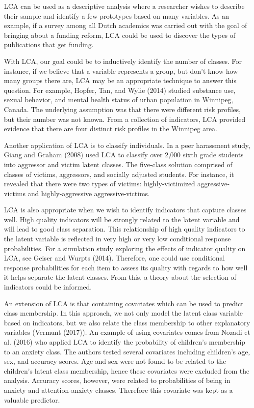 \documentclass[
  ,man,floatsintext]{apa6}
\begin{document}
LCA can be used as a descriptive analysis where a researcher wishes to
describe their sample and identify a few prototypes based on many
variables. As an example, if a survey among all Dutch academics was
carried out with the goal of bringing about a funding reform, LCA could
be used to discover the types of publications that get funding.

With LCA, our goal could be to inductively identify the number of
classes. For instance, if we believe that a variable represents a group,
but don't know how many groups there are, LCA may be an appropriate
technique to answer this question. For example, Hopfer, Tan, and Wylie (2014)
studied substance use, sexual behavior, and mental health status of
urban population in Winnipeg, Canada. The underlying assumption was that
there were different risk profiles, but their number was not known. From
a collection of indicators, LCA provided evidence that there are four
distinct risk profiles in the Winnipeg area.

Another application of LCA is to classify individuals. In a peer
harassment study, Giang and Graham (2008) used LCA to classify over 2,000
sixth grade students into aggressor and victim latent classes. The
five-class solution comprised of classes of victims, aggressors, and
socially adjusted students. For instance, it revealed that there were
two types of victims: highly-victimized aggressive-victims and
highly-aggressive aggressive-victims.

LCA is also appropriate when we wish to identify indicators that capture
classes well. High quality indicators will be strongly related to the
latent variable and will lead to good class separation. This
relationship of high quality indicators to the latent variable is
reflected in very high or very low conditional response probabilities.
For a simulation study exploring the effects of indicator quality on
LCA, see Geiser and Wurpts (2014). Therefore, one could use conditional response
probabilities for each item to assess its quality with regards to how
well it helps separate the latent classes. From this, a theory about the
selection of indicators could be informed.

An extension of LCA is that containing covariates which can be used to
predict class membership. In this approach, we not only model the latent
class variable based on indicators, but we also relate the class
membership to other explanatory variables (Vermunt (2017)). An
example of using covariates comes from Nozadi et al. (2016) who
applied LCA to identify the probability of children's membership to an
anxiety class. The authors tested several covariates including
children's age, sex, and accuracy scores. Age and sex were not found to
be related to the children's latent class membership, hence these
covariates were excluded from the analysis. Accuracy scores, however,
were related to probabilities of being in anxiety and attention-anxiety
classes. Therefore this covariate was kept as a valuable predictor.
\end{document}
